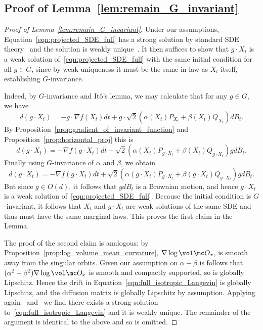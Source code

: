 \documentclass[twoside,a4paper,11pt]{article}
\theoremstyle{plain}
\begin{document}
\subsection{Proof of Lemma~\ref{lem:remain_G_invariant}}
\begin{proof}[Proof of Lemma~\ref{lem:remain_G_invariant}]
Under our assumptions,
Equation~\eqref{eqn:projected_SDE_full}
has a strong solution by standard SDE theory~\cite[Theorem 5.2.1]{oksendal2013stochastic}
and the solution is weakly unique~\cite[Lemma 5.3.1]{oksendal2013stochastic}.
It then suffices to show that $g \cdot X_t$ is a weak
solution of~\eqref{eqn:projected_SDE_full}
with the same initial condition for all $g \in G$,
since by weak uniqueness
it must be the same in law as $X_t$ itself,
establishing $G$-invariance.

Indeed, by $G$-invariance and Itô's lemma,
we may calculate that for any $g \in G$, we have
$$
d(g \cdot X_t)
= -g\cdot \nabla f(X_t)dt + g\cdot \sqrt{2}(\alpha(X_t)
P_{X_t} + \beta(X_t)Q_{X_t})dB_t.
$$ By Proposition~\ref{prop:gradient_of_invariant_function}
and Proposition~\ref{prop:horizontal_proj}
this is
$$
d(g \cdot X_t)
= -\nabla f(g \cdot X_t)dt
+ \sqrt{2}(\alpha(X_t)
P_{g \cdot X_t} +\beta(X_t)Q_{g \cdot X_t})
gdB_t.
$$ Finally using $G$-invariance of $\alpha$ and
$\beta$, we obtain
$$
d(g \cdot X_t)
= -\nabla f(g \cdot X_t)dt
+ \sqrt{2}(\alpha(g \cdot X_t)
P_{g \cdot X_t} + \beta(g\cdot X_t)Q_{g \cdot X_t})
gdB_t.
$$ But since $g \in O(d)$,
it follows that
$gdB_t$ is a Brownian motion, and hence
$g \cdot X_t$ is a weak solution of~\eqref{eqn:projected_SDE_full}. Because the initial
condition is $G$-invariant,
it follows that $X_t$ and $g \cdot X_t$
are weak solutions of the same SDE
and thus must have the same marginal laws. This proves
the first claim in the Lemma.

The proof of the second claim is analogous:
by Proposition~\ref{prop:log_volume_mean_curvature},
$\nabla \log \vol \mc O_x$, is smooth
away from the singular orbits. Given our
assumption on $\alpha - \beta$
is follows that 
$(\alpha^2 - \beta^2) \nabla \log \vol \mc O_x$ 
is smooth and compactly supported,
so is globally
Lipschitz. Hence the drift in
Equation~\eqref{eqn:full_isotropic_Langevin}
is globally Lipschitz,
and the diffusion matrix is globally Lipschitz
by assumption.
Applying again~\cite[Theorem 5.2.1]{oksendal2013stochastic}
and~\cite[Lemma 5.3.1]{oksendal2013stochastic}
we find there exists a strong solution to~\eqref{eqn:full_isotropic_Langevin}
and it is weakly unique. The remainder of the argument
is identical to the above and so is omitted.
\end{proof}
\end{document}
